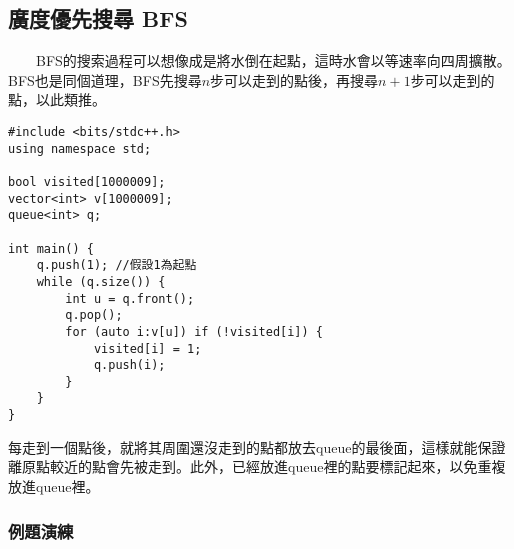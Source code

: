 


\subsection{廣度優先搜尋 BFS}

　　BFS的搜索過程可以想像成是將水倒在起點，這時水會以等速率向四周擴散。BFS也是同個道理，BFS先搜尋$n$步可以走到的點後，再搜尋$n+1$步可以走到的點，以此類推。

\begin{lstlisting}[caption=BFS範例]
#include <bits/stdc++.h>
using namespace std;

bool visited[1000009];
vector<int> v[1000009];
queue<int> q;

int main() {
	q.push(1); //假設1為起點
	while (q.size()) {
		int u = q.front();
		q.pop();
		for (auto i:v[u]) if (!visited[i]) {
			visited[i] = 1;
			q.push(i);
		}
	}
}
\end{lstlisting}

每走到一個點後，就將其周圍還沒走到的點都放去queue的最後面，這樣就能保證離原點較近的點會先被走到。此外，已經放進queue裡的點要標記起來，以免重複放進queue裡。

\subsubsection{例題演練}


